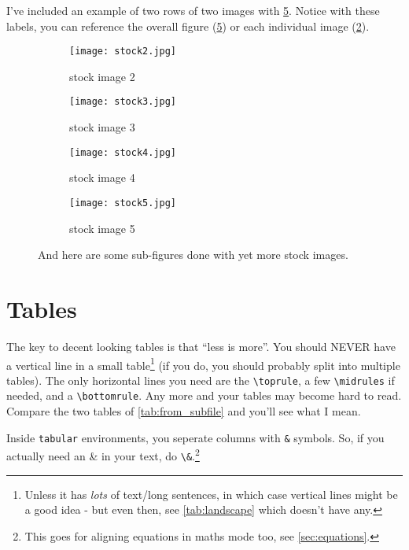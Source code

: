 \documentclass[../main]{subfiles}
\begin{document}
I've included an example of two rows of two images with \cref{fig:stock2_3_4_5}. Notice with these labels, you can reference the overall figure (\cref{fig:stock2_3_4_5}) or each individual image (\cref{fig:stock3}).   

\begin{figure}
    \centering
    \begin{subfigure}[b]{0.45\textwidth}
        \centering
        \texttt{[image: stock2.jpg]}
        \caption{stock image 2}
        \label{fig:stock2}
    \end{subfigure}
    \hfill
    \begin{subfigure}[b]{0.45\textwidth}
        \centering
        \texttt{[image: stock3.jpg]}
        \caption{stock image 3}
        \label{fig:stock3}
    \end{subfigure}
    \hfill
    \begin{subfigure}[b]{0.45\textwidth}
        \centering
        \texttt{[image: stock4.jpg]}
        \caption{stock image 4}
        \label{fig:stock4}
    \end{subfigure}
    \hfill
    \begin{subfigure}[b]{0.45\textwidth}
        \centering
        \texttt{[image: stock5.jpg]}
        \caption{stock image 5}
        \label{fig:stock5}
    \end{subfigure}
    \caption[Sub figures]{And here are some sub-figures done with yet more stock images.}
    \label{fig:stock2_3_4_5}
\end{figure}

\section{Tables}

The key to decent looking tables is that ``less is more''. You should NEVER have a vertical line in a small table\footnote{Unless it has \emph{lots} of text/long sentences, in which case vertical lines might be a good idea - but even then, see \cref{tab:landscape} which doesn't have any.} (if you do, you should probably split into multiple tables). The only horizontal lines you need are the \verb|\toprule|, a few \verb|\midrules| if needed, and a \verb|\bottomrule|. Any more and your tables may become hard to read. Compare the two tables of \cref{tab:from_subfile} and you'll see what I mean.

Inside \texttt{tabular} environments, you seperate columns with \verb|&| symbols. So, if you actually need an \& in your text, do \verb|\&|.\footnote{This goes for aligning equations in maths mode too, see \ref{sec:equations}.}
\end{document}
